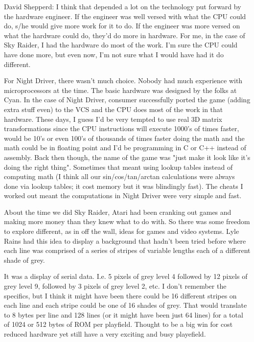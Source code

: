 \textcolor{interviewee}{David Shepperd:} I think that depended a lot on the technology put forward by the hardware engineer. If the engineer was well versed with what the CPU could do, s/he would give more work for it to do. If the engineer was more versed on what the hardware could do, they'd do more in hardware. For me, in the case of Sky Raider, I had the hardware do most of the work. I'm sure the CPU could have done more, but even now, I'm not sure what I would have had it do different.

For Night Driver, there wasn't much choice. Nobody had much experience with microprocessors at the time. The basic hardware was designed by the folks at Cyan. In the case of Night Driver, consumer successfully ported the game (adding extra stuff even) to the VCS and the CPU does most of the work in that hardware. These days, I guess I'd be very tempted to use real 3D matrix transformations since the CPU instructions will execute 1000's of times faster, would be 10's or even 100's of thousands of times faster doing the math and the math could be in floating point and I'd be programming in C or C++ instead of assembly. Back then though, the name of the game was "just make it look like it's doing the right thing". Sometimes that meant using lookup tables instead of computing math (I think all our sin/cos/tan/arctan calculations were always done via lookup tables; it cost memory but it was blindingly fast). The cheats I worked out meant the computations in Night Driver were very simple and fast.

About the time we did Sky Raider, Atari had been cranking out games and making more money than they knew what to do with. So there was some freedom to explore different, as in off the wall, ideas for games and video systems. Lyle Rains had this idea to display a background that hadn't been tried before where each line was comprised of a series of stripes of variable lengths each of a different shade of grey. 

It was a display of serial data. I.e. 5 pixels of grey level 4 followed by 12 pixels of grey level 9, followed by 3 pixels of grey level 2, etc. I don't remember the specifics, but I think it might have been there could be 16 different stripes on each line and each stripe could be one of 16 shades of grey. That would translate to 8 bytes per line and 128 lines (or it might have been just 64 lines) for a total of 1024 or 512 bytes of ROM per playfield. Thought to be a big win for cost reduced hardware yet still have a very exciting and busy playefield.

